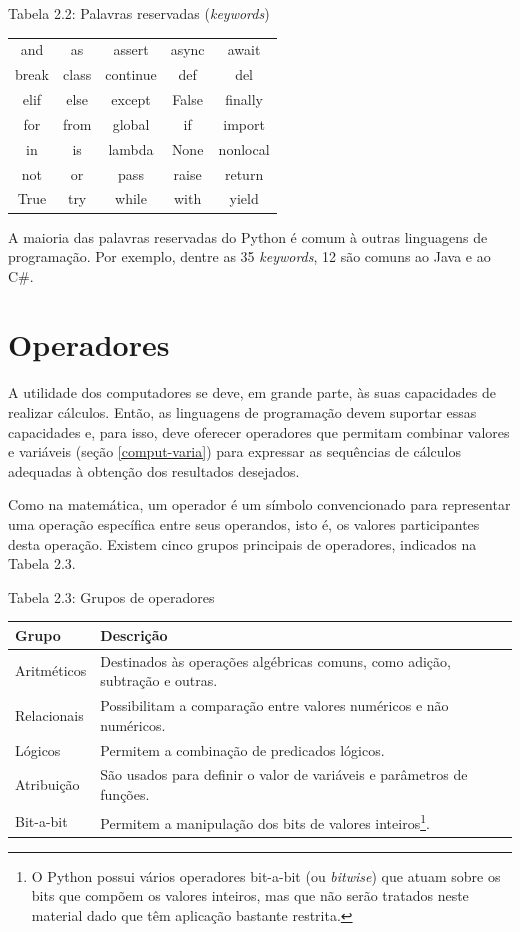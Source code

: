 \documentclass[
]{book}
\begin{document}
Tabela 2.2: Palavras reservadas (\emph{keywords})

\begin{longtable}[]{@{}ccccc@{}}
\toprule
& & & & \\
\midrule
\endhead
and & as & assert & async & await \\
break & class & continue & def & del \\
elif & else & except & False & finally \\
for & from & global & if & import \\
in & is & lambda & None & nonlocal \\
not & or & pass & raise & return \\
True & try & while & with & yield \\
\bottomrule
\end{longtable}

A maioria das palavras reservadas do Python é comum à outras linguagens de programação. Por exemplo, dentre as 35 \emph{keywords}, 12 são comuns ao Java e ao C\#.

\hypertarget{comput-opera}{%
\section{Operadores}\label{comput-opera}}

A utilidade dos computadores se deve, em grande parte, às suas capacidades de realizar cálculos. Então, as linguagens de programação devem suportar essas capacidades e, para isso, deve oferecer operadores que permitam combinar valores e variáveis (seção \ref{comput-varia}) para expressar as sequências de cálculos adequadas à obtenção dos resultados desejados.

Como na matemática, um operador é um símbolo convencionado para representar uma operação específica entre seus operandos, isto é, os valores participantes desta operação. Existem cinco grupos principais de operadores, indicados na Tabela 2.3.

Tabela 2.3: Grupos de operadores

\begin{longtable}[]{@{}
  >{\raggedright\arraybackslash}p{}
  >{\raggedright\arraybackslash}p{}@{}}
\toprule
Grupo & Descrição \\
\midrule
\endhead
Aritméticos & Destinados às operações algébricas comuns, como adição, subtração e outras. \\
Relacionais & Possibilitam a comparação entre valores numéricos e não numéricos. \\
Lógicos & Permitem a combinação de predicados lógicos. \\
Atribuição & São usados para definir o valor de variáveis e parâmetros de funções. \\
Bit-a-bit & Permitem a manipulação dos bits de valores inteiros\footnote{O Python possui vários operadores bit-a-bit (ou \emph{bitwise}) que atuam sobre os bits que compõem os valores inteiros, mas que não serão tratados neste material dado que têm aplicação bastante restrita.}. \\
\bottomrule
\end{longtable}
\end{document}
